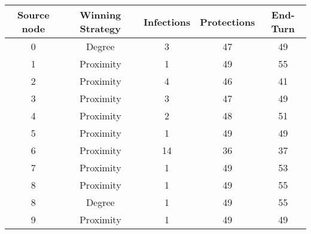 \documentclass[results.tex]{subfiles}
\begin{document}
    \begin{center}
        \begin{tabular}{| c || c | c | c | c |}
            \hline
            {\bfseries Source node} & {\bfseries Winning Strategy} & {\bfseries Infections} & {\bfseries Protections}
            & {\bfseries End-Turn}
            \\  %
            \hline\hline
            0                       & Degree                       & 3                      & 47                      & 49                   \\
            \hline
            1                       & Proximity                    & 1                      & 49                      & 55                   \\
            \hline
            2                       & Proximity                    & 4                      & 46                      & 41                   \\
            \hline
            3                       & Proximity                    & 3                      & 47                      & 49                   \\
            \hline
            4                       & Proximity                    & 2                      & 48                      & 51                   \\
            \hline
            5                       & Proximity                    & 1                      & 49                      & 49                   \\
            \hline
            6                       & Proximity                    & 14                     & 36                      & 37                   \\
            \hline
            7                       & Proximity                    & 1                      & 49                      & 53                   \\
            \hline
            8                       & Proximity                    & 1                      & 49                      & 55                   \\
            \hline
            8                       & Degree                       & 1                      & 49                      & 55                   \\
            \hline
            9                       & Proximity                    & 1                      & 49                      & 49                   \\

\end{tabular}
\end{center}
\end{document}
